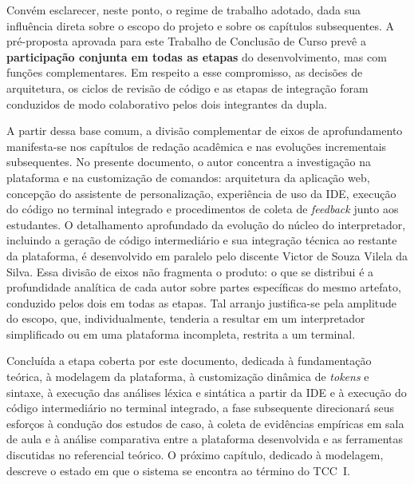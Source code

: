Convém esclarecer, neste ponto, o regime de trabalho adotado, dada sua influência direta sobre o escopo do projeto e sobre os capítulos subsequentes. A pré-proposta aprovada para este Trabalho de Conclusão de Curso prevê a \textbf{participação conjunta em todas as etapas} do desenvolvimento, mas com funções complementares. Em respeito a esse compromisso, as decisões de arquitetura, os ciclos de revisão de código e as etapas de integração foram conduzidos de modo colaborativo pelos dois integrantes da dupla.

A partir dessa base comum, a divisão complementar de eixos de aprofundamento manifesta-se nos capítulos de redação acadêmica e nas evoluções incrementais subsequentes. No presente documento, o autor concentra a investigação na plataforma e na customização de comandos: arquitetura da aplicação web, concepção do assistente de personalização, experiência de uso da IDE, execução do código no terminal integrado e procedimentos de coleta de \textit{feedback} junto aos estudantes. O detalhamento aprofundado da evolução do núcleo do interpretador, incluindo a geração de código intermediário e sua integração técnica ao restante da plataforma, é desenvolvido em paralelo pelo discente Victor de Souza Vilela da Silva. Essa divisão de eixos não fragmenta o produto: o que se distribui é a profundidade analítica de cada autor sobre partes específicas do mesmo artefato, conduzido pelos dois em todas as etapas. Tal arranjo justifica-se pela amplitude do escopo, que, individualmente, tenderia a resultar em um interpretador simplificado ou em uma plataforma incompleta, restrita a um terminal.

Concluída a etapa coberta por este documento, dedicada à fundamentação teórica, à modelagem da plataforma, à customização dinâmica de \textit{tokens} e sintaxe, à execução das análises léxica e sintática a partir da IDE e à execução do código intermediário no terminal integrado, a fase subsequente direcionará seus esforços à condução dos estudos de caso, à coleta de evidências empíricas em sala de aula e à análise comparativa entre a plataforma desenvolvida e as ferramentas discutidas no referencial teórico. O próximo capítulo, dedicado à modelagem, descreve o estado em que o sistema se encontra ao término do TCC~I.
